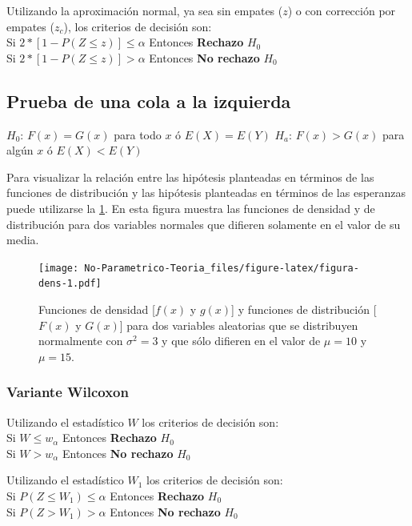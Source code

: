 \documentclass[]{book}
\theoremstyle{definition}
\theoremstyle{definition}
\theoremstyle{definition}
\theoremstyle{remark}
\begin{document}
Utilizando la aproximación normal, ya sea sin empates (\(z\)) o con
corrección por empates (\(z_c\)), los criterios de decisión son:\\
Si \(2*[1-P(Z≤ z )]≤\alpha\) Entonces \textbf{Rechazo} \(H_0\)\\
Si \(2*[1-P(Z≤ z )]>\alpha\) Entonces \textbf{No rechazo} \(H_0\)

\hypertarget{prueba-de-una-cola-a-la-izquierda}{%
\subsection{Prueba de una cola a la
izquierda}\label{prueba-de-una-cola-a-la-izquierda}}

\(H_0\): \(F(x)=G(x)\) para todo \(x\) ó \(E(X)=E(Y)\) \(H_a\):
\(F(x)>G(x)\) para algún \(x\) ó \(E(X)<E(Y)\)

Para visualizar la relación entre las hipótesis planteadas en términos
de las funciones de distribución y las hipótesis planteadas en términos
de las esperanzas puede utilizarse la \ref{fig:figura-dens}. En esta
figura muestra las funciones de densidad y de distribución para dos
variables normales que difieren solamente en el valor de su media.

\begin{figure}
\centering
\texttt{[image: No-Parametrico-Teoria\_files/figure-latex/figura-dens-1.pdf]}
\caption{\label{fig:figura-dens}Funciones de densidad {[}\(f(x)\) y
\(g(x)\){]} y funciones de distribución {[}\(F(x)\) y \(G(x)\){]} para
dos variables aleatorias que se distribuyen normalmente con
\(\sigma^2=3\) y que sólo difieren en el valor de \(\mu=10\) y
\(\mu=15\).}
\end{figure}

\hypertarget{variante-wilcoxon-1}{%
\subsubsection{Variante Wilcoxon}\label{variante-wilcoxon-1}}

Utilizando el estadístico \(W\) los criterios de decisión son:\\
Si \(W≤w_\alpha\) Entonces \textbf{Rechazo} \(H_0\)\\
Si \(W>w_\alpha\) Entonces \textbf{No rechazo} \(H_0\)

Utilizando el estadístico \(W_1\) los criterios de decisión son:\\
Si \(P(Z≤W_1 )≤ \alpha\) Entonces \textbf{Rechazo} \(H_0\)\\
Si \(P(Z>W_1 )> \alpha\) Entonces \textbf{No rechazo} \(H_0\)
\end{document}

